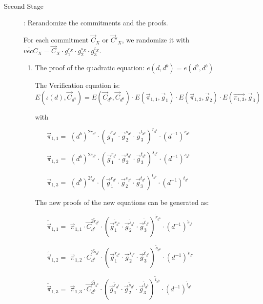 \begin{description}
\begin{enumerate}
\begin{enumerate}
    \end{enumerate}

    
  \end{enumerate}

  
  
\item[Second Stage]: Rerandomize the commitments and the proofs.

  For each commitment $\vec{C}_{X}$ or $\vec{C}'_X$, we randomize it with $\tilde{vec{C}}_X = \vec{C}_X \cdot g_1^{r_X} \cdot g_2^{s_X} \cdot g_3^{t_X}$.
  \begin{enumerate}

  \item The proof of the quadratic equation: $e(d,\boxed{d^b}) = e(\boxed{d^b},\boxed{d^b})$
    
    The Verification equation is: $E(\iota(d), \vec{C}_{d^b}) = E(\vec{C}_{d^b}, \vec{C}_{d^b}) \cdot E(\vec{\pi}_{1,1}, \vec{g}_1)\cdot E(\vec{\pi}_{1,2}, \vec{g}_2)\cdot E(\vec{\pi_{1,3}}, \vec{g}_3)$

    with
    \begin{itemize}
    \item[$\vec{\pi}_{1,1} = $] $(d^b)^{2r_{d^b}}\cdot (\vec{g}_1^{r_{d^b}} \cdot \vec{g}_2^{s_{d^b}} \cdot \vec{g}_3^{t_{d^b}})^{r_{d^b}} \cdot (d^{-1})^{r_{d^b}}$
    \item[$\vec{\pi}_{1,2} = $] $(d^b)^{2s_{d^b}}\cdot (\vec{g}_1^{r_{d^b}} \cdot \vec{g}_2^{s_{d^b}} \cdot \vec{g}_3^{t_{d^b}})^{s_{d^b}} \cdot (d^{-1})^{s_{d^b}}$
    \item[$\vec{\pi}_{1,3} = $] $(d^b)^{2t_{d^b}}\cdot (\vec{g}_1^{r_{d^b}} \cdot \vec{g}_2^{s_{d^b}} \cdot \vec{g}_3^{t_{d^b}})^{t_{d^b}} \cdot (d^{-1})^{t_{d^b}}$
    \end{itemize}

    The new proofs of the new equations can be generated as:

    \begin{itemize}
    \item[$\tilde{\vec{\pi}}_{1,1} = $] $\vec{\pi}_{1,1} \cdot \vec{C}_{d^b}^{2\tilde{r}_{d^b}}\cdot (\vec{g}_1^{\tilde{r}_{d^b}} \cdot \vec{g}_2^{\tilde{s}_{d^b}} \cdot \vec{g}_3^{\tilde{t}_{d^b}})^{\tilde{r}_{d^b}} \cdot (d^{-1})^{\tilde{r}_{d^b}}$
    \item[$\tilde{\vec{\pi}}_{1,2} = $] $\vec{\pi}_{1,2} \cdot \vec{C}_{d^b}^{2\tilde{s}_{d^b}}\cdot (\vec{g}_1^{\tilde{r}_{d^b}} \cdot \vec{g}_2^{\tilde{s}_{d^b}} \cdot \vec{g}_3^{\tilde{t}_{d^b}})^{\tilde{s}_{d^b}} \cdot (d^{-1})^{\tilde{s}_{d^b}}$
    \item[$\tilde{\vec{\pi}}_{1,3} = $] $\vec{\pi}_{1,3} \cdot \vec{C}_{d^b}^{2\tilde{t}_{d^b}}\cdot (\vec{g}_1^{\tilde{r}_{d^b}} \cdot \vec{g}_2^{\tilde{s}_{d^b}} \cdot \vec{g}_3^{\tilde{t}_{d^b}})^{\tilde{t}_{d^b}} \cdot (d^{-1})^{\tilde{t}_{d^b}}$
    \end{itemize}




\end{enumerate}
\end{description}
